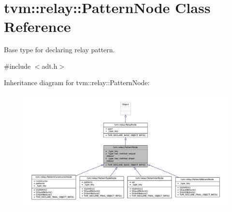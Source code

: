 \hypertarget{classtvm_1_1relay_1_1PatternNode}{}\section{tvm\+:\+:relay\+:\+:Pattern\+Node Class Reference}
\label{classtvm_1_1relay_1_1PatternNode}


Base type for declaring relay pattern.  




{\ttfamily \#include $<$adt.\+h$>$}



Inheritance diagram for tvm\+:\+:relay\+:\+:Pattern\+Node\+:
\nopagebreak
\begin{figure}[H]
\begin{center}
\leavevmode
\includegraphics[width=350pt]{classtvm_1_1relay_1_1PatternNode__inherit__graph}
\end{center}
\end{figure}


